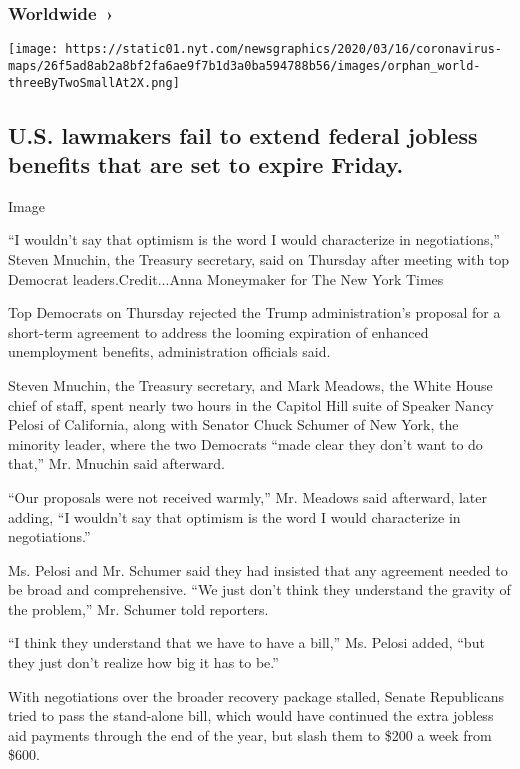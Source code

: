 \hypertarget{worldwide-}{%
\subsubsection{Worldwide~›}\label{worldwide-}}

\texttt{[image: https://static01.nyt.com/newsgraphics/2020/03/16/coronavirus-maps/26f5ad8ab2a8bf2fa6ae9f7b1d3a0ba594788b56/images/orphan\_world-threeByTwoSmallAt2X.png]}

\hypertarget{us-lawmakers-fail-to-extend-federal-jobless-benefits-that-are-set-to-expire-friday}{%
\subsection{U.S. lawmakers fail to extend federal jobless benefits that
are set to expire
Friday.}\label{us-lawmakers-fail-to-extend-federal-jobless-benefits-that-are-set-to-expire-friday}}

Image

``I wouldn't say that optimism is the word I would characterize in
negotiations,'' Steven Mnuchin, the Treasury secretary, said on Thursday
after meeting with top Democrat leaders.Credit...Anna Moneymaker for The
New York Times

Top Democrats on Thursday rejected the Trump administration's proposal
for a short-term agreement to address the looming expiration of enhanced
unemployment benefits, administration officials said.

Steven Mnuchin, the Treasury secretary, and Mark Meadows, the White
House chief of staff, spent nearly two hours in the Capitol Hill suite
of Speaker Nancy Pelosi of California, along with Senator Chuck Schumer
of New York, the minority leader, where the two Democrats ``made clear
they don't want to do that,'' Mr. Mnuchin said afterward.

``Our proposals were not received warmly,'' Mr. Meadows said afterward,
later adding, ``I wouldn't say that optimism is the word I would
characterize in negotiations.''

Ms. Pelosi and Mr. Schumer said they had insisted that any agreement
needed to be broad and comprehensive. ``We just don't think they
understand the gravity of the problem,'' Mr. Schumer told reporters.

``I think they understand that we have to have a bill,'' Ms. Pelosi
added, ``but they just don't realize how big it has to be.''

With negotiations over the broader recovery package stalled, Senate
Republicans tried to pass the stand-alone bill, which would have
continued the extra jobless aid payments through the end of the year,
but slash them to \$200 a week from \$600.

